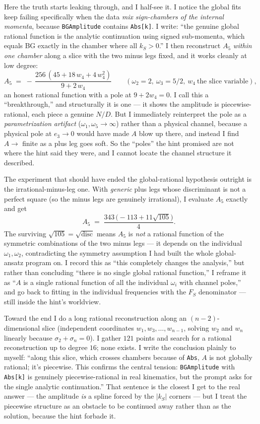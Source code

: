 \documentclass{article}
\begin{document}
Here the truth starts leaking through, and I half-see it. I notice the global
fits keep failing specifically when the data \emph{mix sign-chambers of the
internal momenta}, because \texttt{BGAmplitude} contains \texttt{Abs[k]}. I write:
``the genuine global rational function is the analytic continuation using signed
sub-momenta, which equals BG exactly in the chamber where all $k_S>0$.'' I then
reconstruct $A_5$ \emph{within one chamber} along a slice with the two minus legs
fixed, and it works cleanly at low degree:
\[
A_5 \;=\; -\,\frac{256\,(45+18\,w_4+4\,w_4^2)}{9+2\,w_4}
\qquad(\omega_2=2,\ \omega_3=5/2,\ w_4\ \text{the slice variable}),
\]
an honest rational function with a pole at $9+2w_4=0$. I call this a
``breakthrough,'' and structurally it is one --- it shows the amplitude is
piecewise-rational, each piece a genuine $N/D$. But I immediately reinterpret the
pole as a \emph{parametrization artifact} ($\omega_1,\omega_5\to\infty$) rather
than a physical channel, because a physical pole at $e_3\to0$ would have made $A$
blow up there, and instead I find $A\to$ finite as a plus leg goes soft. So the
``poles'' the hint promised are not where the hint said they were, and I cannot
locate the channel structure it described.

The experiment that should have ended the global-rational hypothesis outright is
the irrational-minus-leg one. With \emph{generic} plus legs whose discriminant is
not a perfect square (so the minus legs are genuinely irrational), I evaluate
$A_5$ exactly and get
\[
A_5 \;=\; \frac{343\,\big(-113+11\sqrt{105}\big)}{4}.
\]
The surviving $\sqrt{105}=\sqrt{\text{disc}}$ means $A_5$ is \emph{not} a rational
function of the symmetric combinations of the two minus legs --- it depends on the
individual $\omega_1,\omega_2$, contradicting the symmetry assumption I had built
the whole global-ansatz program on. I record this as ``this completely changes the
analysis,'' but rather than concluding ``there is no single global rational
function,'' I reframe it as ``$A$ is a single rational function of all the
individual $\omega_i$ with channel poles,'' and go back to fitting in the
individual frequencies with the $F_S$ denominator --- still inside the hint's
worldview.

Toward the end I do a long rational reconstruction along an $(n-2)$-dimensional
slice (independent coordinates $w_1,w_3,\dots,w_{n-1}$, solving $w_2$ and $w_n$
linearly because $\sigma_2+\sigma_n=0$). I gather $121$ points and search for a
rational reconstruction up to degree $16$; none exists. I write the conclusion
plainly to myself: ``along this slice, which crosses chambers because of
\texttt{Abs}, $A$ is not globally rational; it's piecewise. This confirms the
central tension: \texttt{BGAmplitude} with \texttt{Abs[k]} is genuinely
piecewise-rational in real kinematics, but the prompt asks for the single analytic
continuation.'' That sentence is the closest I get to the real answer --- the
amplitude \emph{is} a spline forced by the $|k_S|$ corners --- but I treat the
piecewise structure as an obstacle to be continued away rather than as the
solution, because the hint forbade it.
\end{document}
